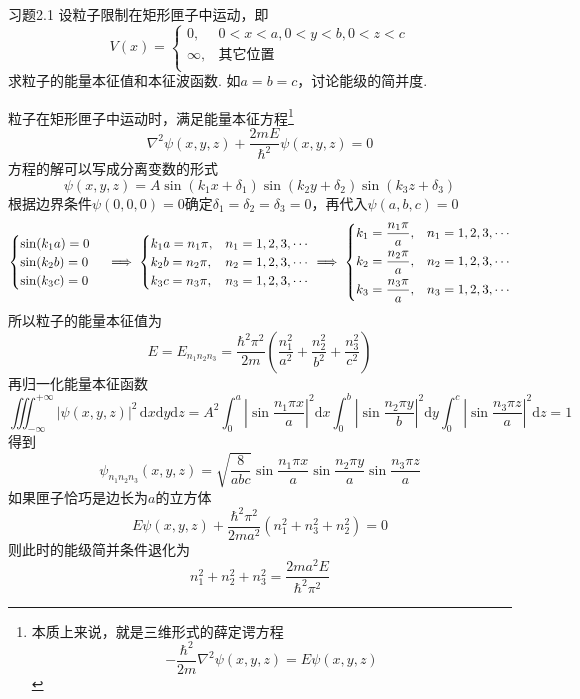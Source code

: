 \begin{question}{习题2.1}
    设粒子限制在矩形匣子中运动，即
    $$
        V(x) = \begin{cases}
            0,      & 0<x<a, 0<y<b, 0<z<c \\
            \infty, & \text{其它位置}         \\
        \end{cases}
    $$
    求粒子的能量本征值和本征波函数. 如$a=b=c$，讨论能级的简并度.
\end{question}
\begin{solution}
    粒子在矩形匣子中运动时，满足能量本征方程\footnote{本质上来说，就是三维形式的薛定谔方程$$-\frac{\hbar^2}{2m}\nabla^2\psi(x,y,z)=E\psi(x,y,z)$$}
    $$
        \nabla^2\psi(x,y,z) + \frac{2mE}{\hbar^2}\psi(x,y,z)= 0
    $$
    方程的解可以写成分离变数的形式
    $$
        \psi(x,y,z)=A\sin(k_1x+\delta_1)\sin(k_2y+\delta_2)\sin(k_3z+\delta_3)
    $$
    根据边界条件$\psi(0,0,0)=0$确定$\delta_1=\delta_2=\delta_3=0$，再代入$\psi(a,b,c)=0$
    $$
        \begin{cases}
            \sin(k_1a)=0 \\
            \sin(k_2b)=0 \\
            \sin(k_3c)=0 \\
        \end{cases}
        \implies
        \begin{cases}
            k_1a = n_1\pi, & n_1=1,2,3,\cdots \\
            k_2b = n_2\pi, & n_2=1,2,3,\cdots \\
            k_3c = n_3\pi, & n_3=1,2,3,\cdots \\
        \end{cases}
        \implies
        \begin{dcases}
            k_1=\frac{n_1\pi}{a}, & n_1=1,2,3,\cdots \\
            k_2=\frac{n_2\pi}{a}, & n_2=1,2,3,\cdots \\
            k_3=\frac{n_3\pi}{a}, & n_3=1,2,3,\cdots \\
        \end{dcases}
    $$
    所以粒子的能量本征值为
    $$
        E=E_{n_1n_2n_3}=\frac{\hbar^2\pi^2}{2m}\left(\frac{n_1^2}{a^2}+\frac{n_2^2}{b^2}+\frac{n_3^2}{c^2}\right)
    $$
    再归一化能量本征函数
    $$
        \iiint_{-\infty}^{+\infty}|\psi(x,y,z)|^2\,\mathrm{d}x\mathrm{d}y\mathrm{d}z
        =A^2\int_{0}^{a}\left|\sin\frac{n_1\pi x}{a}\right|^2\mathrm{d}x
        \int_{0}^{b}\left|\sin\frac{n_2\pi y}{b}\right|^2\mathrm{d}y
        \int_{0}^{c}\left|\sin\frac{n_3\pi z}{a}\right|^2\mathrm{d}z
        =1
    $$
    得到
    $$
        \psi_{n_1n_2n_3}(x,y,z) = \sqrt{\frac{8}{abc}}\sin\frac{n_1\pi x}{a}\sin\frac{n_2\pi y}{a}\sin\frac{n_3\pi z}{a}
    $$
    如果匣子恰巧是边长为$a$的立方体
    $$
        E\psi(x,y,z) + \frac{\hbar^2\pi^2}{2ma^2}\left(n_1^2+n_3^2+n_2^2\right) = 0
    $$
    则此时的能级简并条件退化为
    $$
        n_1^2+n_2^2+n_3^2 = \frac{2ma^2E}{\hbar^2\pi^2}
    $$
\end{solution}




